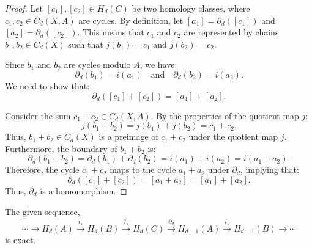 \begin{proof}
Let $[c_1], [c_2] \in H_d(C)$ be two homology classes, where $c_1, c_2 \in C_d(X,A)$ are cycles. By definition, let $[a_1] = \partial_d([c_1])$ and $[a_2] = \partial_d([c_2])$. This means that $c_1$ and $c_2$ are represented by chains $b_1, b_2 \in C_d(X)$ such that $j(b_1) = c_1$ and $j(b_2) = c_2$. 

Since $b_1$ and $b_2$ are cycles modulo $A$, we have:
\[
\partial_d(b_1) = i(a_1) \quad \text{and} \quad \partial_d(b_2) = i(a_2).
\]
We need to show that:
\[
\partial_d([c_1] + [c_2]) = [a_1] + [a_2].
\]

Consider the sum $c_1 + c_2 \in C_d(X,A)$. By the properties of the quotient map $j$:
\[
j(b_1 + b_2) = j(b_1) + j(b_2) = c_1 + c_2.
\]
Thus, $b_1 + b_2 \in C_d(X)$ is a preimage of $c_1 + c_2$ under the quotient map $j$. Furthermore, the boundary of $b_1 + b_2$ is:
\[
\partial_d(b_1 + b_2) = \partial_d(b_1) + \partial_d(b_2) = i(a_1) + i(a_2) = i(a_1 + a_2).
\]
Therefore, the cycle $c_1 + c_2$ maps to the cycle $a_1 + a_2$ under $\partial_d$, implying that:
\[
\partial_d([c_1] + [c_2]) = [a_1 + a_2] = [a_1] + [a_2].
\]
Thus, $\partial_d$ is a homomorphism.
\end{proof}

\begin{lemma}
\label{exacthomsequence}
The given sequence,
\begin{equation*}
\cdots \rightarrow H_d(A) \xrightarrow{i_\star} H_d(B) \xrightarrow{j_\star} H_d(C) \xrightarrow{\partial_d} H_{d-1}(A) \xrightarrow{i_\star} H_{d-1}(B) \rightarrow \cdots
\end{equation*}
is exact.
\end{lemma}

